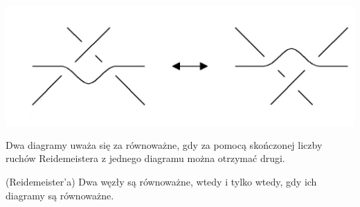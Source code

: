\begin{definicja}
\begin{enumerate}
	\begin{minipage}{0.65\textwidth}
		\begin{center}
			\includegraphics[scale=0.25]{1/pictures/R3}
		\end{center}
	\end{minipage}
	
	\end{enumerate}
 
\end{definicja}

\begin{definicja}
 Dwa diagramy uważa się za równoważne, gdy za pomocą skończonej liczby ruchów Reidemeistera z jednego diagramu można otrzymać drugi.
\end{definicja}

\begin{twierdzenie}{(Reidemeister'a)}
Dwa węzły są równoważne, wtedy i tylko wtedy, gdy ich diagramy są równoważne.
\end{twierdzenie}

